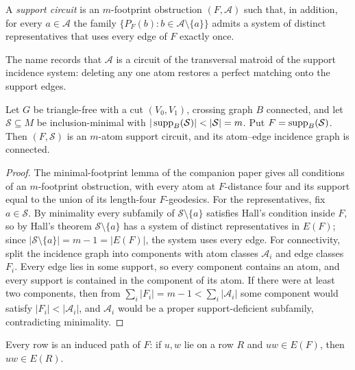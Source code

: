 \begin{definition}\label{def:t4:circuit}
A \emph{support circuit} is an \(m\)-footprint obstruction
\((F,\mathcal A)\) such that, in addition, for every \(a\in\mathcal A\)
the family \(\{P_F(b):b\in\mathcal A\setminus\{a\}\}\) admits a system
of distinct representatives that uses every edge of \(F\) exactly once.
\end{definition}

The name records that \(\mathcal A\) is a circuit of the transversal
matroid of the support incidence system: deleting any one atom restores
a perfect matching onto the support edges.

\begin{lemma}[Transfer]\label{lem:t4:transfer}
Let \(G\) be triangle-free with a cut \((V_0,V_1)\), crossing graph
\(B\) connected, and let \(\mathcal S\subseteq M\) be inclusion-minimal
with \(|\supp_B(\mathcal S)|<|\mathcal S|=m\). Put
\(F=\operatorname{supp}_B(\mathcal S)\). Then \((F,\mathcal S)\) is an \(m\)-atom
support circuit, and its atom--edge incidence graph is connected.
\end{lemma}

\begin{proof}
The minimal-footprint lemma of the companion paper \cite{Ferudun26supports} gives all
conditions of an \(m\)-footprint obstruction, with every atom at
\(F\)-distance four and its support equal to the union of its
length-four \(F\)-geodesics. For the representatives, fix
\(a\in\mathcal S\). By minimality every subfamily of
\(\mathcal S\setminus\{a\}\) satisfies Hall's condition inside \(F\), so
by Hall's theorem \(\mathcal S\setminus\{a\}\) has a system of distinct
representatives in \(E(F)\); since
\(|\mathcal S\setminus\{a\}|=m-1=|E(F)|\), the system uses every edge.
For connectivity, split the incidence graph into components with atom
classes \(\mathcal A_i\) and edge classes \(F_i\). Every edge lies in
some support, so every component contains an atom, and every support is
contained in the component of its atom. If there were at least two
components, then from \(\sum_i|F_i|=m-1<\sum_i|\mathcal A_i|\) some
component would satisfy \(|F_i|<|\mathcal A_i|\), and \(\mathcal A_i\)
would be a proper support-deficient subfamily, contradicting
minimality.
\end{proof}

\begin{lemma}\label{lem:t4:induced}
Every row is an induced path of \(F\): if \(u,w\) lie on a row \(R\)
and \(uw\in E(F)\), then \(uw\in E(R)\).
\end{lemma}

